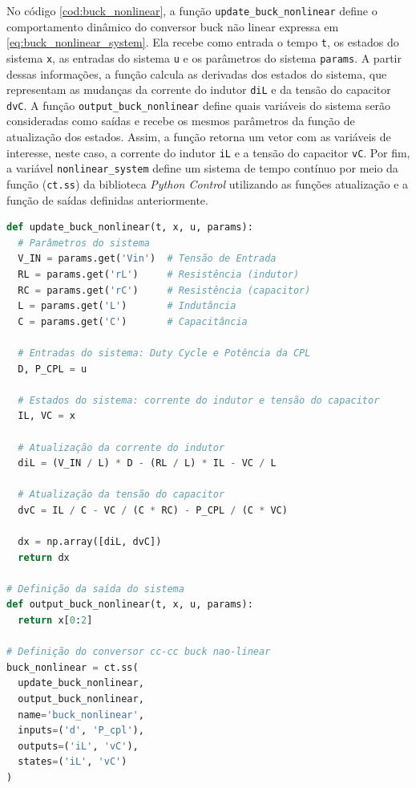 No código \ref{cod:buck_nonlinear}, a função \texttt{update\_buck\_nonlinear} define o comportamento dinâmico do conversor buck não linear expressa em \eqref{eq:buck_nonlinear_system}. Ela recebe como entrada o tempo \texttt{t}, os estados do sistema \texttt{x}, as entradas do sistema \texttt{u} e os parâmetros do sistema \texttt{params}. A partir dessas informações, a função calcula as derivadas dos estados do sistema, que representam as mudanças da corrente do indutor \texttt{diL} e da tensão do capacitor \texttt{dvC}. A função \texttt{output\_buck\_nonlinear} define quais variáveis do sistema serão consideradas como saídas e recebe os mesmos parâmetros da função de atualização dos estados. Assim, a função retorna um vetor com as variáveis de interesse, neste caso, a corrente do indutor \texttt{iL} e a tensão do capacitor \texttt{vC}. Por fim, a variável \texttt{nonlinear\_system} define um sistema de tempo contínuo por meio da função (\texttt{ct.ss}) da biblioteca \textit{Python Control} utilizando as funções atualização e a função de saídas definidas anteriormente.
\vspace{8pt}

\begin{lstlisting}[language=Python, caption={Implementação do conversor Buck não linear.}, label=cod:buck_nonlinear]
def update_buck_nonlinear(t, x, u, params):
  # Parâmetros do sistema
  V_IN = params.get('Vin')  # Tensão de Entrada
  RL = params.get('rL')     # Resistência (indutor)
  RC = params.get('rC')     # Resistência (capacitor)
  L = params.get('L')       # Indutância
  C = params.get('C')       # Capacitância

  # Entradas do sistema: Duty Cycle e Potência da CPL
  D, P_CPL = u

  # Estados do sistema: corrente do indutor e tensão do capacitor
  IL, VC = x

  # Atualização da corrente do indutor
  diL = (V_IN / L) * D - (RL / L) * IL - VC / L  

  # Atualização da tensão do capacitor   
  dvC = IL / C - VC / (C * RC) - P_CPL / (C * VC)

  dx = np.array([diL, dvC])
  return dx

# Definição da saída do sistema
def output_buck_nonlinear(t, x, u, params):
  return x[0:2]

# Definição do conversor cc-cc buck nao-linear
buck_nonlinear = ct.ss(
  update_buck_nonlinear, 
  output_buck_nonlinear,
  name='buck_nonlinear',
  inputs=('d', 'P_cpl'),
  outputs=('iL', 'vC'),
  states=('iL', 'vC')
)
\end{lstlisting}

